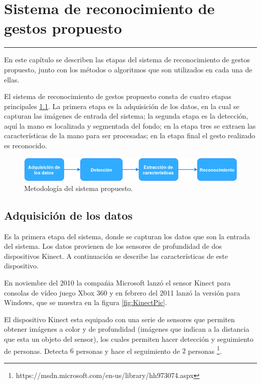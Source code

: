 \chapter{Sistema de reconocimiento de gestos propuesto}\label{capit:cap3}
\vspace{-2.0325ex}%
\noindent
\rule{\textwidth}{0.5pt}
\vspace{-5.5ex}%
\newcommand{\pushline}{\Indp}%

En este cap\'itulo se describen las etapas del sistema de reconocimiento de gestos propuesto, junto con los métodos o algoritmos que son utilizados en cada una de ellas.   

El sistema de reconocimiento de gestos propuesto consta de cuatro etapas principales \ref{fig:MyHGR}. La primera etapa es la adquisición de los datos, en la cual se capturan las imágenes de entrada del sistema; la segunda etapa es la detección, aquí la mano es localizada y segmentada del fondo; en la etapa tres se extraen las características de la mano para ser procesadas; en la etapa final el gesto realizado es reconocido.   

\begin{figure}[h!]
\begin{center}
\includegraphics[scale=.6]{./Figures/MyHGR.png}
\end{center}
\caption{Metodología del sistema propuesto.}
\label{fig:MyHGR}
\end{figure}  
  
\section{Adquisición de los datos}\label{sec:KinectSensor} 

Es la primera etapa del sistema, donde se capturan los datos que son la entrada del sistema. Los datos provienen de los sensores de profundidad de dos dispositivos Kinect. A continuación se describe las características de este dispositivo. 

En noviembre del 2010 la compa\'nia Microsoft lanz\'o el sensor Kinect para consolas de vídeo juego Xbox 360 y en febrero del 2011 lanz\'o la versi\'on para Windows, que se muestra en la figura \ref{fig:KinectPic}.  

El dispositivo Kinect esta equipado con una serie de sensores que permiten obtener imágenes a color y de profundidad (imágenes que indican a la distancia que esta un objeto del sensor), los cuales permiten hacer detección y seguimiento de personas. Detecta $6$ personas y hace el seguimiento de $2$ personas \footnote{https://msdn.microsoft.com/en-us/library/hh973074.aspx}.    
  
